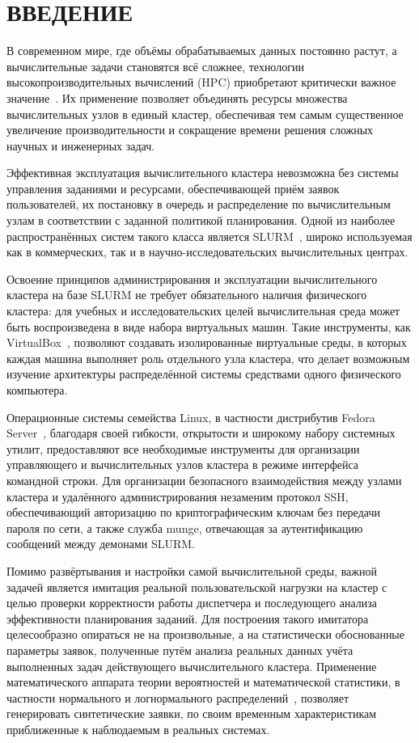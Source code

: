 \newpage
\section*{ВВЕДЕНИЕ}

В современном мире, где объёмы обрабатываемых данных постоянно
растут, а вычислительные задачи становятся всё сложнее, технологии высокопроизводительных вычислений (HPC) приобретают критически
важное значение~\cite{feitelson2015workload,sherrill2023hpcruntime}. Их применение позволяет объединять ресурсы
множества вычислительных узлов в единый кластер, обеспечивая тем
самым существенное увеличение производительности и сокращение
времени решения сложных научных и инженерных задач.

Эффективная эксплуатация вычислительного кластера невозможна без
системы управления заданиями и ресурсами, обеспечивающей приём
заявок пользователей, их постановку в очередь и распределение по
вычислительным узлам в соответствии с заданной политикой
планирования. Одной из наиболее распространённых систем такого
класса является SLURM~\cite{yoo2003slurm, schedmd2024slurm}, широко используемая как в коммерческих, так и в
научно-исследовательских вычислительных центрах.

Освоение принципов администрирования и эксплуатации
вычислительного кластера на базе SLURM не требует обязательного
наличия физического кластера: для учебных и исследовательских
целей вычислительная среда может быть воспроизведена в виде набора
виртуальных машин. Такие инструменты, как VirtualBox~\cite{oracle2024vbox}, позволяют
создавать изолированные виртуальные среды, в которых каждая
машина выполняет роль отдельного узла кластера, что делает
возможным изучение архитектуры распределённой системы средствами
одного физического компьютера.

Операционные системы семейства Linux, в частности дистрибутив
Fedora Server~\cite{fedora2024docs}, благодаря своей гибкости, открытости и широкому
набору системных утилит, предоставляют все необходимые
инструменты для организации управляющего и вычислительных узлов
кластера в режиме интерфейса командной строки. Для организации
безопасного взаимодействия между узлами кластера и удалённого
администрирования незаменим протокол SSH,
обеспечивающий авторизацию по криптографическим ключам без
передачи пароля по сети, а также служба munge, отвечающая за
аутентификацию сообщений между демонами SLURM.

Помимо развёртывания и настройки самой вычислительной среды,
важной задачей является имитация реальной пользовательской
нагрузки на кластер с целью проверки корректности работы
диспетчера и последующего анализа эффективности планирования
заданий. Для построения такого имитатора целесообразно опираться
не на произвольные, а на статистически обоснованные параметры
заявок, полученные путём анализа реальных данных учёта
выполненных задач действующего вычислительного
кластера. Применение математического аппарата теории вероятностей
и математической статистики, в частности нормального и
логнормального распределений~\cite{gmurman2003stat}, позволяет генерировать синтетические
заявки, по своим временным характеристикам приближенные к
наблюдаемым в реальных системах.


